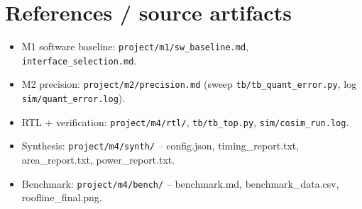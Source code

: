 \documentclass[11pt]{article}
\begin{document}
\section*{References / source artifacts}
\small
\begin{itemize}[noitemsep]
  \item M1 software baseline: \texttt{project/m1/sw\_baseline.md},
        \texttt{interface\_selection.md}.
  \item M2 precision: \texttt{project/m2/precision.md} (sweep
        \texttt{tb/tb\_quant\_error.py}, log \texttt{sim/quant\_error.log}).
  \item RTL + verification: \texttt{project/m4/rtl/}, \texttt{tb/tb\_top.py},
        \texttt{sim/cosim\_run.log}.
  \item Synthesis: \texttt{project/m4/synth/} -- config.json,
        timing\_report.txt, area\_report.txt, power\_report.txt.
  \item Benchmark: \texttt{project/m4/bench/} -- benchmark.md,
        benchmark\_data.csv, roofline\_final.png.
\end{itemize}
\end{document}
